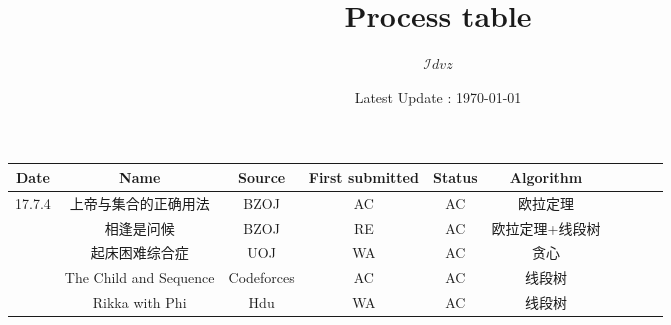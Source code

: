 \documentclass[landscape]{article}
\date{Latest Update : \today}
\title{Process table}
\author{$\mathcal Idvz$}
\begin{document}
\maketitle

\begin{longtable}{cccccccccc}
  \hline
  Date & Name & Source & First submitted & Status & Algorithm\\
  \hline
  17.7.4 & 上帝与集合的正确用法 & BZOJ & AC & AC & 欧拉定理\\

  & 相逢是问候 & BZOJ & RE & AC & 欧拉定理+线段树\\

  & 起床困难综合症 & UOJ & WA & AC & 贪心\\

  & The Child and Sequence & Codeforces & AC & AC & 线段树\\

  & Rikka with Phi & Hdu & WA & AC & 线段树\\


\end{longtable}
\end{document}
